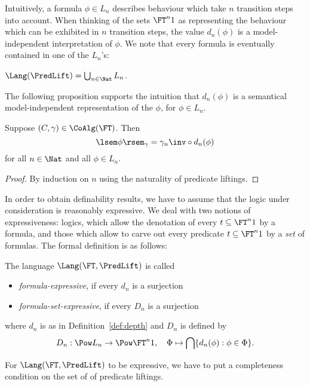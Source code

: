 \documentclass{entcs}
\begin{document}
Intuitively, a formula $\phi \in L_n$ describes behaviour which take $n$
transition steps into account. When thinking of the sets $\FT^n 1$ as
representing the behaviour which can be exhibited in $n$ transition steps, the
value $d_n(\phi)$ is a model-independent interpretation of $\phi$. We note that
every formula is eventually contained in one of the $L_n$'s:

\begin{propn} \label{propn:all-of-L}
$\Lang(\PredLift) = \bigcup_{n \in \Nat} L_n$.
\end{propn}

The following proposition supports the intuition that $d_n(\phi)$ is a
semantical model-independent representation of the $\phi$, for $\phi \in L_n$.

\begin{propn} \label{propn:semantics}
Suppose $(C, \gamma) \in \CoAlg(\FT)$. Then
\[
\lsem \phi \rsem_\gamma = \gamma_n\inv \circ d_n (\phi)
\]
for all $n \in \Nat$ and all $\phi \in L_n$.
\end{propn}
\begin{proof}
By induction on $n$ using the naturality of predicate liftings.
\end{proof}

In order to obtain definability results, we have to assume that the logic
under consideration is reasonably expressive. We deal with two notions of
expressiveness: logics, which allow the denotation of every $t \subseteq \FT^n
1$ by a formula, and those which allow to carve out every predicate $t
\subseteq \FT^n 1$ by a \emph{set} of formulas. The formal definition is as
follows:

\begin{defn} \label{defn:expressive}
The language $\Lang(\FT,\PredLift)$ is called
\begin{itemize}
\item \emph{formula-expressive}, if every $d_n$ is a surjection
\item \emph{formula-set-expressive}, if every $D_n$ is a surjection
\end{itemize}
where  $d_n$ is as in Definition~\ref{def:depth} and $D_n$ is defined by
\[
  D_n:\Pow L_n\to \Pow\FT^n 1, \quad\Phi\mapsto
  \bigcap\{d_n(\phi):\phi\in\Phi\}.
\]
\end{defn}
%
For $\Lang(\FT,\PredLift)$ to be expressive, we have to put a completeness
condition on the set of of predicate liftings.
\end{document}
